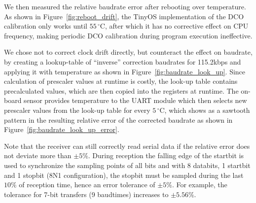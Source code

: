 We then measured the relative baudrate error after rebooting over temperature.
As shown in Figure~\ref{fig:reboot_drift}, the TinyOS implementation of the DCO calibration only works until $55\,^{\circ}\mathrm{C}$, after which it has no corrective effect on CPU frequency, making periodic DCO calibration during program execution ineffective.

We chose not to correct clock drift directly, but counteract the effect on baudrate, by creating a lookup-table of ``inverse'' correction baudrates for 115.2kbps and applying it with temperature as shown in Figure~\ref{fig:baudrate_look_up}.
Since calculation of prescaler values at runtime is costly, the look-up table contains precalculated values, which are then copied into the registers at runtime.
The on-board sensor provides temperature to the UART module which then selects new prescaler values from the look-up table for every $5\,^{\circ}\mathrm{C}$, which shows as a sawtooth pattern in the resulting relative error of the corrected baudrate as shown in Figure~\ref{fig:baudrate_look_up_error}.

Note that the receiver can still correctly read serial data if the relative error does not deviate more than $\pm5\%$. During reception the falling edge of the startbit is used to synchronize the sampling points of all bits and with 8 databits, 1 startbit and 1 stopbit (8N1 configuration), the stopbit must be sampled during the last $10\%$ of reception time, hence an error tolerance of $\pm5\%$.
For example, the tolerance for 7-bit transfers (9 baudtimes) increases to $\pm5.56\%$.